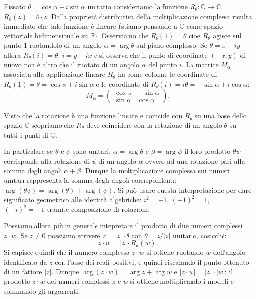 \documentclass[italian,a4paper,oneside,headinclude]{scrbook}
\newcommand{\CC}{\mathbb C}
\newcommand{\RR}{\mathbb R}
\newcommand{\abs}[1]{{\left|#1\right|}}
\begin{document}
Fissato $\theta = \cos \alpha + i \sin \alpha$ unitario
consideriamo la funzione $R_\theta\colon \CC \to \CC$,
$R_\theta(z) = \theta\cdot z$.
Dalla proprietà distributiva della moltiplicazione complessa risulta
immediato che tale funzione è lineare (stiamo pensando a $\CC$ come
spazio vettoriale bidimensionale su $\RR$).
Osserviamo che $R_\theta(1) = \theta$ cioe $R_\theta$ agisce sul punto $1$
ruotandolo di un angolo $\alpha=\arg \theta$ sul piano complesso.
Se $\theta=x+ i y$ allora $R_\theta(i) = \theta\cdot i = y - ix$ e si osserva
che il punto di coordinate $(-x, y)$ di nuovo
non è altro che il ruotato di un angolo
$\alpha$ del punto $i$.
La matrice $M_\alpha$ associata alla applicazione lineare $R_\theta$ ha come
colonne le coordinate di $R_\theta(1) = \theta = \cos \alpha + i \sin \alpha$
e le coordinate di $R_\theta(i) = i\theta = -\sin \alpha + i \cos \alpha$:
\[
  M_\alpha =
  \begin{pmatrix}
  \cos \alpha & -\sin \alpha \\
  \sin \alpha & \cos \alpha
  \end{pmatrix}.
\]

Visto che la rotazione è una funzione lineare e coincide con $R_\theta$
su una base dello spazio $\CC$ scopriamo che $R_\theta$ deve coincidere con
la rotazione di un angolo $\theta$ su tutti i punti di $\CC$.

In particolare se $\theta$ e $\psi$ sono unitari, $\alpha= \arg \theta$ e
$\beta=\arg \psi$ il loro prodotto
$\theta\psi$ corrisponde alla rotazione di $\psi$ di un angolo $\alpha$
ovvero ad una rotazione pari alla somma degli angoli $\alpha+\beta$.
Dunque la moltiplicazione complessa sui numeri unitari rappresenta la somma
degli angoli corrispondenti: $\arg(\theta\psi) = \arg(\theta) + \arg(\psi)$.
Si può usare questa interpretazione
per dare significato geometrico alle identità algebriche: $i^2=-1$, $(-1)^2 = 1$,
$(-i)^2 = -1$ tramite composizione di rotazioni.

Possiamo allora più in generale intepretare il prodotto di due numeri complessi
$z\cdot w$. Se $z\neq 0$ possiamo scrivere $z = \abs{z} \cdot \theta$ con
$\theta= z/\abs{z}$ unitario, cosicché:
\[
  z \cdot w = \abs{z} \cdot R_\theta(w).
\]
Si capisce quindi che il numero complesso $z\cdot w$ si ottiene ruotando
$w$ dell'angolo identificato da $z$ con l'asse dei reali positivi, e quindi
riscalando il punto ottenuto di un fattore $\abs{z}$.
Dunque $\arg(z\cdot w) = \arg z + \arg w$ e $\abs{z\cdot w} = \abs{z}\cdot\abs{w}$:
il prodotto $z\cdot w$ dei numeri complessi $z$ e $w$ si ottiene moltiplicando
i moduli e sommando gli argomenti.
\end{document}

